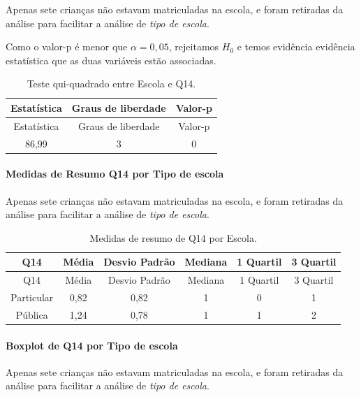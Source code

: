 \documentclass[]{article}
\let\oldparagraph\paragraph
\renewcommand{\paragraph}[1]{\oldparagraph{#1}\mbox{}}
\begin{document}
Apenas sete crianças não estavam matriculadas na escola, e foram retiradas da análise para facilitar a análise de \emph{tipo de escola}.

Como o valor-p é menor que \(\alpha=0,05\), rejeitamos \(H_0\) e temos evidência evidência estatística que as duas variáveis estão associadas.

\begin{longtable}[]{@{}ccc@{}}
\caption{\label{tab:unnamed-chunk-90}Teste qui-quadrado entre Escola e Q14.}\tabularnewline
\toprule
Estatística & Graus de liberdade & Valor-p\tabularnewline
\midrule
\endfirsthead
\toprule
Estatística & Graus de liberdade & Valor-p\tabularnewline
\midrule
\endhead
86,99 & 3 & 0\tabularnewline
\bottomrule
\end{longtable}

\cleardoublepage

\hypertarget{medidas-de-resumo-q14-por-tipo-de-escola}{%
\paragraph{Medidas de Resumo Q14 por Tipo de escola}\label{medidas-de-resumo-q14-por-tipo-de-escola}}

Apenas sete crianças não estavam matriculadas na escola, e foram retiradas da análise para facilitar a análise de \emph{tipo de escola}.

\begin{longtable}[]{@{}cccccc@{}}
\caption{\label{tab:unnamed-chunk-91}Medidas de resumo de Q14 por Escola.}\tabularnewline
\toprule
Q14 & Média & Desvio Padrão & Mediana & 1 Quartil & 3 Quartil\tabularnewline
\midrule
\endfirsthead
\toprule
Q14 & Média & Desvio Padrão & Mediana & 1 Quartil & 3 Quartil\tabularnewline
\midrule
\endhead
Particular & 0,82 & 0,82 & 1 & 0 & 1\tabularnewline
Pública & 1,24 & 0,78 & 1 & 1 & 2\tabularnewline
\bottomrule
\end{longtable}

\hypertarget{boxplot-de-q14-por-tipo-de-escola}{%
\paragraph{Boxplot de Q14 por Tipo de escola}\label{boxplot-de-q14-por-tipo-de-escola}}

Apenas sete crianças não estavam matriculadas na escola, e foram retiradas da análise para facilitar a análise de \emph{tipo de escola}.
\end{document}
